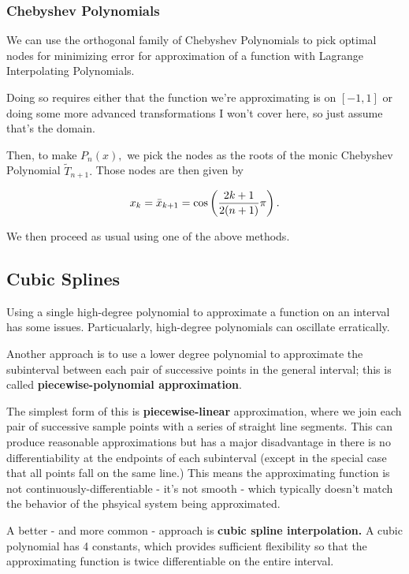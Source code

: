 \documentclass{article}
\begin{document}
\subsubsection{Chebyshev Polynomials}

We can use the \@{orthogonal} family of Chebyshev Polynomials to pick optimal nodes for minimizing error for approximation of a function with Lagrange Interpolating Polynomials.

Doing so requires either that the function we're approximating is on $[-1, 1]$ or doing some more advanced transformations I won't cover here, so just assume that's the domain.

Then, to make $P_n(x),$ we pick the nodes as the roots of the monic Chebyshev Polynomial $\tilde{T}_{n+1}.$ Those nodes are then given by

\[ x_k = \bar{x}_{k+1} = \cos{\left(\frac{2k + 1}{2(n+1)} \pi\right).} \]

We then proceed as usual using one of the above methods.
 
\subsection{Cubic Splines}

Using a single high-degree polynomial to approximate a function on an interval has some issues. Particualarly, high-degree polynomials can oscillate erratically.

Another approach is to use a lower degree polynomial to approximate the subinterval between each pair of successive points in the general interval; this is called \textbf{piecewise-polynomial approximation}.

The simplest form of this is \textbf{piecewise-linear} approximation, where we join each pair of successive sample points with a series of straight line segments. This can produce reasonable approximations but has a major disadvantage in there is no differentiability at the endpoints of each subinterval (except in the special case that all points fall on the same line.) This means the approximating function is not \@{continuously-differentiable} - it's not \@{smooth} - which typically doesn't match the behavior of the phsyical system being approximated.

A better - and more common - approach is \textbf{cubic spline interpolation.} A cubic polynomial has 4 constants, which provides sufficient flexibility so that the approximating function is twice \@{differentiable} on the entire interval.
\end{document}

